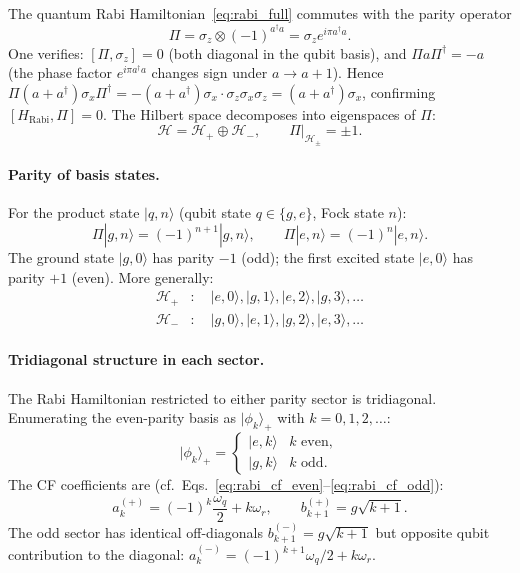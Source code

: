 \documentclass[reprint, floatfix, superscriptaddress, amsmath, amssymb, longbibliography]{revtex4-2}
\begin{document}
The quantum Rabi Hamiltonian~\eqref{eq:rabi_full} commutes with the parity operator
\begin{equation}
\Pi = \sigma_z \otimes (-1)^{a^\dagger a} = \sigma_z e^{i\pi a^\dagger a}.
\label{eq:parity_op}
\end{equation}
One verifies: $[\Pi, \sigma_z] = 0$ (both diagonal in the qubit basis), and $\Pi a \Pi^\dagger = -a$ (the phase factor $e^{i\pi a^\dagger a}$ changes sign under $a \to a + 1$). Hence $\Pi(a + a^\dagger)\sigma_x\Pi^\dagger = -(a + a^\dagger)\sigma_x \cdot \sigma_z\sigma_x\sigma_z = (a+a^\dagger)\sigma_x$, confirming $[H_{\mathrm{Rabi}}, \Pi] = 0$.
The Hilbert space decomposes into eigenspaces of $\Pi$:
\begin{equation}
\mathcal{H} = \mathcal{H}_+ \oplus \mathcal{H}_-, \qquad \Pi|_{\mathcal{H}_\pm} = \pm 1.
\label{eq:hilbert_decomp}
\end{equation}

\paragraph{Parity of basis states.} For the product state $|q, n\rangle$ (qubit state $q \in \{g, e\}$, Fock state $n$):
\begin{equation}
\Pi|g, n\rangle = (-1)^{n+1}|g, n\rangle, \qquad \Pi|e, n\rangle = (-1)^n|e, n\rangle.
\label{eq:basis_parity}
\end{equation}
The ground state $|g, 0\rangle$ has parity $-1$ (odd); the first excited state $|e, 0\rangle$ has parity $+1$ (even). More generally:
\begin{align}
\mathcal{H}_+ &: \quad |e,0\rangle, |g,1\rangle, |e,2\rangle, |g,3\rangle, \ldots \label{eq:even_sector} \\
\mathcal{H}_- &: \quad |g,0\rangle, |e,1\rangle, |g,2\rangle, |e,3\rangle, \ldots \label{eq:odd_sector}
\end{align}

\paragraph{Tridiagonal structure in each sector.} The Rabi Hamiltonian restricted to either parity sector is tridiagonal. Enumerating the even-parity basis as $|\phi_k\rangle_+$ with $k = 0, 1, 2, \ldots$:
\begin{equation}
|\phi_k\rangle_+ = \begin{cases}
|e, k\rangle & k \text{ even}, \\
|g, k\rangle & k \text{ odd}.
\end{cases}
\label{eq:even_enum}
\end{equation}
The CF coefficients are (cf.~Eqs.~\ref{eq:rabi_cf_even}--\ref{eq:rabi_cf_odd}):
\begin{equation}
a_k^{(+)} = (-1)^k \frac{\omega_q}{2} + k\omega_r, \qquad b_{k+1}^{(+)} = g\sqrt{k+1}.
\label{eq:even_cf}
\end{equation}
The odd sector has identical off-diagonals $b_{k+1}^{(-)} = g\sqrt{k+1}$ but opposite qubit contribution to the diagonal: $a_k^{(-)} = (-1)^{k+1}\omega_q/2 + k\omega_r$.
\end{document}
